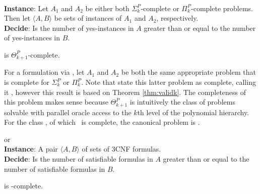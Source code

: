 \begin{problem}{} \label{thm:cph}  \\
    \tab \textbf{Instance}: Let $A_1$ and $A_2$ be either both $\Sigma_k^P$-complete
or $\Pi_k^P$-complete problems.
    Then let $\langle A,B \rangle$ be sets of instances of $A_1$ and
    $A_2$, respectively.\\
    \tab \textbf{Decide}: Is the number of yes-instances in $A$
    greater than or equal to the number of yes-instances in $B$.
\end{problem}

\begin{theorem}\label{thm:validk} \citep{compsat}
     is $\Theta_{k+1}^P$-complete.
\end{theorem}

For a formulation via , let $A_1$ and $A_2$ be
both the
same appropriate  problem that is complete for
$\Sigma_k^P$ or $\Pi_k^P$.
Note that \citet{compsat} state this latter problem as complete,
calling it , however this result is based on Theorem
\ref{thm:validk}.
The completeness of this problem makes sense because
$\Theta_{k+1}^P$ is intuitively the
class of problems solvable with parallel oracle access to the $k$th level of
the polynomial hierarchy.
For the class \tp, of which \dwin~is complete, the canonical problem is \csat.

\begin{problem}{\csat or } \citep{compsat}\\
    \tab \textbf{Instance}: A pair $\langle A,B \rangle$
of sets of 3CNF formulas.\\
    \tab \textbf{Decide}: Is the number of satisfiable formulas in $A$
    greater than or equal to the number of satisfiable formulas in $B$.
\end{problem}


\begin{theorem}\label{thm:csat} \citep{compsat}
    \csat is \tp-complete.
\end{theorem}



